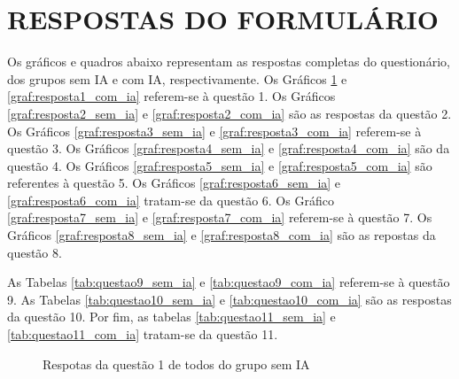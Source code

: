 \documentclass[english,brazilian]{UNISINOSartigo} %
\begin{document}
\section{RESPOSTAS DO FORMULÁRIO}

\renewcommand{\thefigure}{F.\arabic{figure}}
\setcounter{figure}{0}

\renewcommand{\thetable}{F.\arabic{table}}
\setcounter{table}{0}

Os gráficos e quadros abaixo representam as respostas completas do questionário, dos grupos sem IA e com IA, respectivamente. Os Gráficos \ref{graf:resposta1_sem_ia} e \ref{graf:resposta1_com_ia} referem-se à questão 1. Os Gráficos \ref{graf:resposta2_sem_ia} e \ref{graf:resposta2_com_ia} são as respostas da questão 2. Os Gráficos \ref{graf:resposta3_sem_ia} e \ref{graf:resposta3_com_ia} referem-se à questão 3. Os Gráficos \ref{graf:resposta4_sem_ia} e \ref{graf:resposta4_com_ia} são da questão 4. Os Gráficos \ref{graf:resposta5_sem_ia} e \ref{graf:resposta5_com_ia} são referentes à questão 5. Os Gráficos \ref{graf:resposta6_sem_ia} e \ref{graf:resposta6_com_ia} tratam-se da questão 6. Os Gráfico \ref{graf:resposta7_sem_ia} e \ref{graf:resposta7_com_ia} referem-se à questão 7. Os Gráficos \ref{graf:resposta8_sem_ia} e \ref{graf:resposta8_com_ia} são as repostas da questão 8.

As Tabelas \ref{tab:questao9_sem_ia} e \ref{tab:questao9_com_ia} referem-se à questão 9. As Tabelas \ref{tab:questao10_sem_ia} e \ref{tab:questao10_com_ia} são as respostas da questão 10. Por fim, as tabelas \ref{tab:questao11_sem_ia} e \ref{tab:questao11_com_ia} tratam-se da questão 11.

\begin{figure}[ht]
    \caption{Respotas da questão 1 de todos do grupo sem IA}
    \label{graf:resposta1_sem_ia}
    \centering
    \footnotesize
    \begin{minipage}{.9\textwidth}
        \centering
    \end{minipage}
\end{figure}
\FloatBarrier
\end{document}
